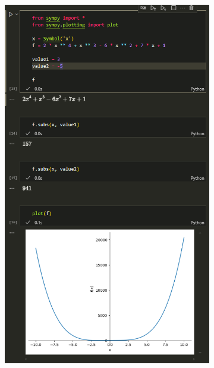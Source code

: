 \documentclass[14pt,a4paper]{extarticle}
\begin{document}
\begin{figure}[h!]
    \centering
    \begin{subfigure}{.5\textwidth}
        \centering
        \includegraphics[width=0.9\linewidth]{figures/inftech/lab1/1.1 (3).png}
        \label{fig:1.1(3)}
    \end{subfigure}%
    \begin{subfigure}{.5\textwidth}
        \centering

\end{subfigure}
\end{figure}
\end{document}
